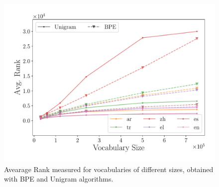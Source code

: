 \begin{figure}[tb!]
    \centering
    \includegraphics[width=1.0\linewidth]{figures/AR_x_vocabulary_.pdf}
    
    \caption{Avearage Rank measured for vocabularies of different sizes, obtained with BPE and Unigram algorithms.}
    \label{fig:ar_vocab}
\end{figure}